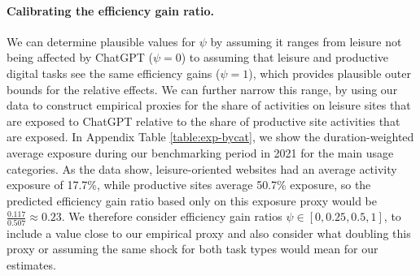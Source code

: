 \documentclass[12pt]{article}
\begin{document}
\paragraph{Calibrating the efficiency gain ratio.} We can determine plausible values for $\psi$ by assuming it ranges from leisure not being affected by ChatGPT ($\psi = 0$) to assuming that leisure and productive digital tasks see the same efficiency gains ($\psi = 1$), which provides plausible outer bounds for the relative effects. 
We can further narrow this range, by using our data to construct empirical proxies for the share of activities on leisure sites that are exposed to ChatGPT relative to the share of productive site activities that are exposed. In Appendix Table \ref{table:exp-bycat}, we show the duration-weighted average exposure during our benchmarking period in 2021 for the main usage categories. As the data show, leisure-oriented websites had an average activity exposure of 17.7\%, while productive sites average 50.7\% exposure, so the predicted efficiency gain ratio based only on this exposure proxy would be $\frac{0.117}{0.507} \approx 0.23$.  We therefore consider efficiency gain ratios $\psi\in[0,0.25,0.5, 1]$, to include a value close to our empirical proxy and also consider what doubling this proxy or assuming the same shock for both task types would mean for our estimates.
\end{document}
